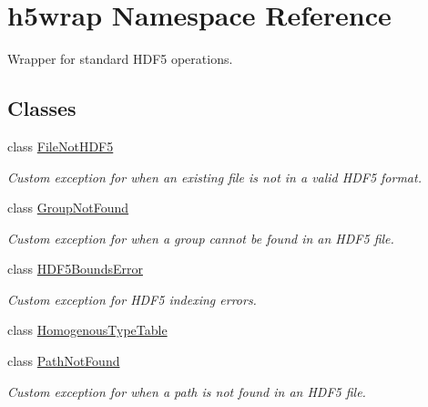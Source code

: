\hypertarget{namespaceh5wrap}{}\section{h5wrap Namespace Reference}
\label{namespaceh5wrap}


Wrapper for standard H\+D\+F5 operations.  


\subsection*{Classes}
\begin{DoxyCompactItemize}
\item 
class \hyperlink{classh5wrap_1_1_file_not_h_d_f5}{File\+Not\+H\+D\+F5}
\begin{DoxyCompactList}\small\item\em Custom exception for when an existing file is not in a valid H\+D\+F5 format. \end{DoxyCompactList}\item 
class \hyperlink{classh5wrap_1_1_group_not_found}{Group\+Not\+Found}
\begin{DoxyCompactList}\small\item\em Custom exception for when a group cannot be found in an H\+D\+F5 file. \end{DoxyCompactList}\item 
class \hyperlink{classh5wrap_1_1_h_d_f5_bounds_error}{H\+D\+F5\+Bounds\+Error}
\begin{DoxyCompactList}\small\item\em Custom exception for H\+D\+F5 indexing errors. \end{DoxyCompactList}\item 
class \hyperlink{classh5wrap_1_1_homogenous_type_table}{Homogenous\+Type\+Table}
\item 
class \hyperlink{classh5wrap_1_1_path_not_found}{Path\+Not\+Found}
\begin{DoxyCompactList}\small\item\em Custom exception for when a path is not found in an H\+D\+F5 file. \end{DoxyCompactList}\end{DoxyCompactItemize}
